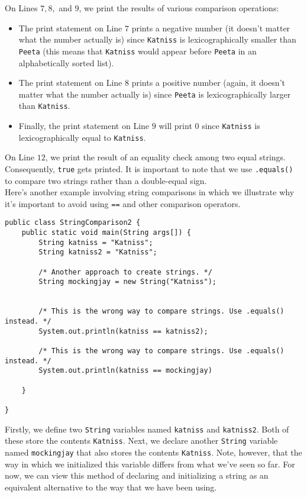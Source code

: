 On Lines $7, 8,$ and $9$, we print the results of various comparison operations:

\begin{itemize}
    \item The print statement on Line $7$ prints a negative number (it doesn't matter what the number actually is) since \verb!Katniss! is lexicographically smaller than \verb!Peeta! (this means that \verb!Katniss! would appear before \verb!Peeta! in an alphabetically sorted list). 
    \item The print statement on Line $8$ prints a positive number (again, it doesn't matter what the number actually is) since \verb!Peeta! is lexicographically larger than \verb!Katniss!. 
    \item Finally, the print statement on Line $9$ will print $0$ since \verb!Katniss! is lexicographically equal to \verb!Katniss!. 
\end{itemize}

On Line $12$, we print the result of an equality check among two equal strings. Consequently, \verb!true! gets printed. It is important to note that we use \verb!.equals()! to compare two strings rather than a double-equal sign. \\


Here's another example involving string comparisons in which we illustrate why it's important to avoid using \verb!==!  and other comparison operators.

\begin{lstlisting}
public class StringComparison2 {
    public static void main(String args[]) {
        String katniss = "Katniss";
        String katniss2 = "Katniss";
        
        /* Another approach to create strings. */
        String mockingjay = new String("Katniss");
        
        
        /* This is the wrong way to compare strings. Use .equals() instead. */
        System.out.println(katniss == katniss2);
        
        /* This is the wrong way to compare strings. Use .equals() instead. */
        System.out.println(katniss == mockingjay)
        
    }
    
}
\end{lstlisting}

Firstly, we define two \verb!String! variables named \verb!katniss! and \verb!katniss2!. Both of these store the contents \verb!Katniss!. Next, we declare another \verb!String! variable named \verb!mockingjay! that also stores the contents \verb!Katniss!. Note, however, that the way in which we initialized this variable differs from what we've seen so far. For now, we  can view this method of declaring and initializing a string as an equivalent alternative to the way that we have been using. \\

